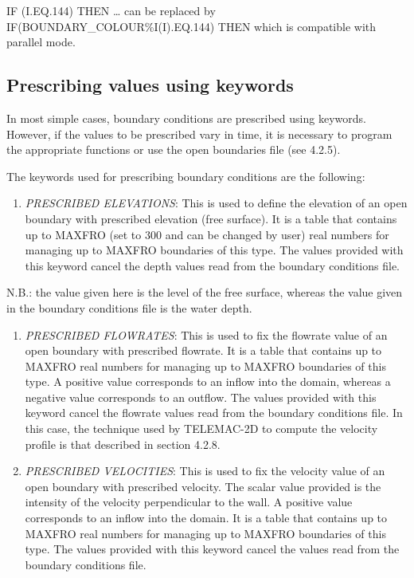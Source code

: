  IF (I.EQ.144) THEN {\dots} can be replaced by IF(BOUNDARY\_COLOUR\%I(I).EQ.144) THEN which is compatible with parallel mode.


\subsection{ Prescribing values using keywords}

 In most simple cases, boundary conditions are prescribed using keywords. However, if the values to be prescribed vary in time, it is necessary to program the appropriate functions or use the open boundaries file (see 4.2.5).

 The keywords used for prescribing boundary conditions are the following:

\begin{enumerate}
\item  \textit{PRESCRIBED ELEVATIONS}: This is used to define the elevation of an open boundary with prescribed elevation (free surface). It is a table that contains up to MAXFRO (set to 300 and can be changed by user) real numbers for managing up to MAXFRO boundaries of this type. The values provided with this keyword cancel the depth values read from the boundary conditions file.
\end{enumerate}

 N.B.: the value given here is the level of the free surface, whereas the value given in the boundary conditions file is the water depth.

\begin{enumerate}
\item  \textit{PRESCRIBED FLOWRATES}: This is used to fix the flowrate value of an open boundary with prescribed flowrate. It is a table that contains up to MAXFRO real numbers for managing up to MAXFRO boundaries of this type. A positive value corresponds to an inflow into the domain, whereas a negative value corresponds to an outflow. The values provided with this keyword cancel the flowrate values read from the boundary conditions file. In this case, the technique used by TELEMAC-2D to compute the velocity profile is that described in section 4.2.8.

\item  \textit{PRESCRIBED VELOCITIES}: This is used to fix the velocity value of an open boundary with prescribed velocity. The scalar value provided is the intensity of the velocity perpendicular to the wall. A positive value corresponds to an inflow into the domain. It is a table that contains up to MAXFRO real numbers for managing up to MAXFRO boundaries of this type. The values provided with this keyword cancel the values read from the boundary conditions file.
\end{enumerate}

